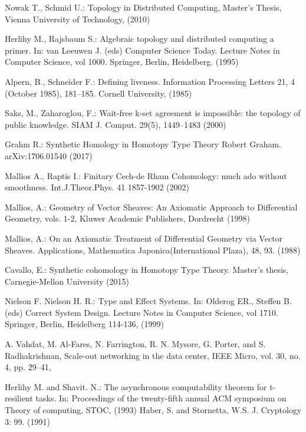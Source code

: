 \documentclass[runningheads]{llncs}
\begin{document}
\begin{thebibliography}{8}
Nowak T., Schmid U.: Topology in Distributed Computing, Master's Thesis, Vienna University of Technology, (2010)

Herlihy M., Rajsbaum S.: Algebraic topology and distributed computing a primer. In: van Leeuwen J. (eds) Computer Science Today. Lecture Notes in Computer Science, vol 1000. Springer, Berlin, Heidelberg. (1995)

Alpern, B., Schneider F.: Defining liveness. Information Processing Letters 21, 4 (October 1985), 181--185. Cornell University, (1985)

Saks, M., Zaharoglou, F.: Wait-free k-set agreement is impossible: the topology of public knowledge. SIAM J. Comput. 29(5), 1449–1483 (2000)

Grahm R.: Synthetic Homology in Homotopy Type Theory Robert Graham. arXiv:1706.01540 (2017)

Mallios A., Raptis I.: Finitary Cech-de Rham Cohomology: much ado without smoothness. Int.J.Theor.Phys. 41 1857-1902 (2002)

Mallios, A.: Geometry of Vector Sheaves: An Axiomatic Approach to Differential Geometry, vols. 1-2, Kluwer Academic Publishers, Dordrecht (1998)

Mallios, A.: On an Axiomatic Treatment of Differential Geometry via Vector Sheaves. Applications, Mathematica Japonica(International Plaza), 48, 93. (1988)

Cavallo, E.: Synthetic cohomology in Homotopy Type Theory. Master’s thesis, Carnegie-Mellon University (2015)

Nielson F. Nielson H. R.: Type and Effect Systems. In: Olderog ER., Steffen B. (eds) Correct System Design. Lecture Notes in Computer Science, vol 1710. Springer, Berlin, Heidelberg 114-136, (1999)

A. Vahdat, M. Al-Fares, N. Farrington, R. N. Mysore, G. Porter, and S. Radhakrishnan, Scale-out networking in the data center, IEEE Micro, vol. 30, no. 4, pp. 29–41, 

Herlihy M. and Shavit. N.: The asynchronous computability theorem for t-resilient tasks. In: Proceedings of the twenty-fifth annual ACM symposium on Theory of computing, STOC, (1993)
Haber, S. and Stornetta, W.S. J. Cryptology  3: 99.  (1991)


\end{thebibliography}
\end{document}

